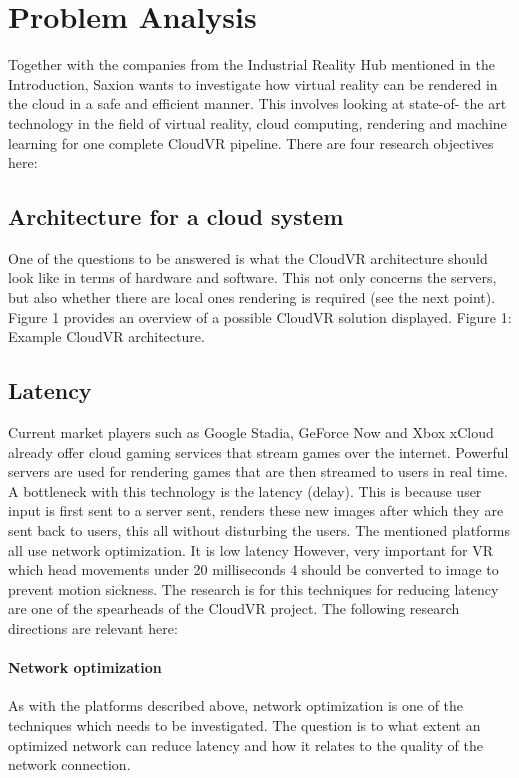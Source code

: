 \section{Problem Analysis}

Together with the companies from the Industrial Reality Hub mentioned in the Introduction, Saxion wants to investigate how virtual reality
can be rendered in the cloud in a safe and efficient manner. This involves looking at state-of-
the art technology in the field of virtual reality, cloud computing, rendering and machine learning for one
complete CloudVR pipeline. There are four research objectives here:

\subsection{Architecture for a cloud system}
One of the questions to be answered is what the CloudVR architecture should look like
in terms of hardware and software. This not only concerns the servers, but also whether there are local ones
rendering is required (see the next point). Figure 1 provides an overview of a possible CloudVR
solution displayed.
Figure 1: Example CloudVR architecture.

\subsection{Latency}
Current market players such as Google Stadia, GeForce Now and Xbox xCloud already offer cloud gaming
services that stream games over the internet. Powerful servers are used for rendering
games that are then streamed to users in real time. A bottleneck with this technology is the latency (delay). This is because user input is first sent to a server
sent, renders these new images after which they are sent back to users, this
all without disturbing the users.
The mentioned platforms all use network optimization. It is low latency
However, very important for VR which head movements under 20 milliseconds 4 should be
converted to image to prevent motion sickness. The research is for this
techniques for reducing latency are one of the spearheads of the CloudVR project.
The following research directions are relevant here:
\paragraph{Network optimization}
As with the platforms described above, network optimization is one of the techniques
which needs to be investigated. The question is to what extent an optimized network
can reduce latency and how it relates to the quality of the network connection.
